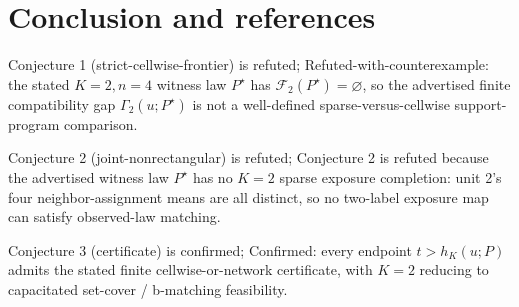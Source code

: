 \documentclass[11pt]{article}
\theoremstyle{definition}
\theoremstyle{plain}
\theoremstyle{remark}
\begin{document}
\section{Conclusion and references}
Conjecture 1 (strict-cellwise-frontier) is refuted; Refuted-with-counterexample: the stated \(K=2,n=4\) witness law \(P^\star\) has \(\mathcal F_2(P^\star)=\varnothing\), so the advertised finite compatibility gap \(\Gamma_2(u;P^\star)\) is not a well-defined sparse-versus-cellwise support-program comparison.

Conjecture 2 (joint-nonrectangular) is refuted; Conjecture 2 is refuted because the advertised witness law \(P^\star\) has no \(K=2\) sparse exposure completion: unit 2's four neighbor-assignment means are all distinct, so no two-label exposure map can satisfy observed-law matching.

Conjecture 3 (certificate) is confirmed; Confirmed: every endpoint \(t>h_K(u;P)\) admits the stated finite cellwise-or-network certificate, with \(K=2\) reducing to capacitated set-cover / b-matching feasibility.
\end{document}
